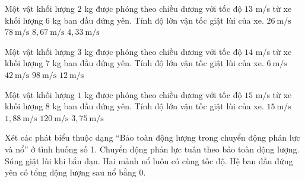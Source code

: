 \begin{ex}
Một vật khối lượng $2$ kg được phóng theo chiều dương với tốc độ $13$ m/s từ xe khối lượng $6$ kg ban đầu đứng yên. Tính độ lớn vận tốc giật lùi của xe.
\choice
{$26\ \mathrm{m/s}$}
{$78\ \mathrm{m/s}$}
{$8,67\ \mathrm{m/s}$}
{\True $4,33\ \mathrm{m/s}$}
\end{ex}

\begin{ex}
Một vật khối lượng $3$ kg được phóng theo chiều dương với tốc độ $14$ m/s từ xe khối lượng $7$ kg ban đầu đứng yên. Tính độ lớn vận tốc giật lùi của xe.
\choice
{\True $6\ \mathrm{m/s}$}
{$42\ \mathrm{m/s}$}
{$98\ \mathrm{m/s}$}
{$12\ \mathrm{m/s}$}
\end{ex}

\begin{ex}
Một vật khối lượng $1$ kg được phóng theo chiều dương với tốc độ $15$ m/s từ xe khối lượng $8$ kg ban đầu đứng yên. Tính độ lớn vận tốc giật lùi của xe.
\choice
{$15\ \mathrm{m/s}$}
{\True $1,88\ \mathrm{m/s}$}
{$120\ \mathrm{m/s}$}
{$3,75\ \mathrm{m/s}$}
\end{ex}

\begin{ex}
Xét các phát biểu thuộc dạng “Bảo toàn động lượng trong chuyển động phản lực và nổ” ở tình huống số 1.
\choiceTF
{\True Chuyển động phản lực tuân theo bảo toàn động lượng.}
{\True Súng giật lùi khi bắn đạn.}
{Hai mảnh nổ luôn có cùng tốc độ.}
{\True Hệ ban đầu đứng yên có tổng động lượng sau nổ bằng 0.}
\end{ex}

